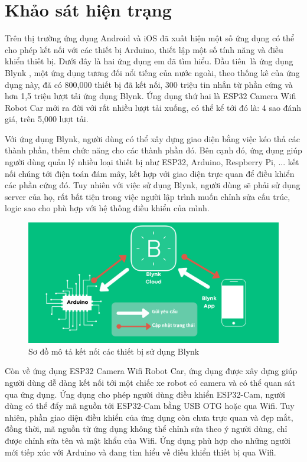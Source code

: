 \documentclass[../DoAn.tex]{subfiles}
\begin{document}
\section{Khảo sát hiện trạng}
\label{section:2.1}
Trên thị trường ứng dụng Android và iOS đã xuất hiện một số ứng dụng có thể cho phép kết nối với các thiết bị Arduino, thiết lập một số tính năng và điều khiển thiết bị. Dưới đây là hai ứng dụng em đã tìm hiểu. Đầu tiên là ứng dụng Blynk \cite{Blynk}, một ứng dụng tương đối nổi tiếng của nước ngoài, theo thống kê của ứng dụng này, đã có 800,000 thiết bị đã kết nối, 300 triệu tin nhắn từ phần cứng và hơn 1,5 triệu lượt tải ứng dụng Blynk. Ứng dụng thứ hai là ESP32 Camera Wifi Robot Car mới ra đời với rất nhiều lượt tải xuống, có thể kể tới đó là: 4 sao đánh giá, trên 5,000 lượt tải.

Với ứng dụng Blynk, người dùng có thể xây dựng giao diện bằng việc kéo thả các thành phần, thêm chức năng cho các thành phần đó. Bên cạnh đó, ứng dụng giúp người dùng quản lý nhiều loại thiết bị như ESP32, Arduino, Respberry Pi, ... kết nối chúng tới điện toán đám mây, kết hợp với giao diện trực quan để điều khiển các phần cứng đó. Tuy nhiên với việc sử dụng Blynk, người dùng sẽ phải sử dụng server của họ, rất bất tiện trong việc người lập trình muốn chỉnh sửa cấu trúc, logic sao cho phù hợp với hệ thống điều khiển của mình.

\begin{figure}[H]
    \includegraphics[scale = 0.4]{Hinhve/blynk.png}
    \centering
    \caption{Sơ đồ mô tả kết nối các thiết bị sử dụng Blynk}
\end{figure}

Còn về ứng dụng ESP32 Camera Wifi Robot Car, ứng dụng được xây dựng giúp người dùng dễ dàng kết nối tới một chiếc xe robot có camera và có thể quan sát qua ứng dụng. Ứng dụng cho phép người dùng điều khiển ESP32-Cam, người dùng có thể đẩy mã nguồn tới ESP32-Cam bằng USB OTG hoặc qua Wifi. Tuy nhiên, phần giao diện điều khiển của ứng dụng còn chưa trực quan và đẹp mắt, đồng thời, mã nguồn từ ứng dụng không thể chỉnh sửa theo ý người dùng, chỉ được chỉnh sửa tên và mật khẩu của Wifi. Ứng dụng phù hợp cho những người mới tiếp xúc với Arduino và đang tìm hiểu về điều khiển thiết bị qua Wifi.
\end{document}
